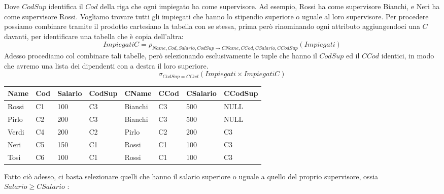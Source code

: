 \documentclass[12pt, letterpaper]{article}
\begin{document}
Dove \(CodSup\) identifica il \(Cod\) della riga che ogni impiegato ha come supervisore. Ad esempio, Rossi ha 
come supervisore Bianchi, e Neri ha come supervisore Rossi. Vogliamo trovare tutti gli impiegati che hanno 
lo stipendio superiore o uguale al loro supervisore. Per procedere possiamo combinare tramite il prodotto cartesiano 
la tabella con se stessa, prima però rinominando ogni attributo aggiungendoci una \(C\) davanti, per identificare 
una tabella che è copia dell'altra:
\begin{equation}
    ImpiegatiC = \rho_{Name,Cod,Salario,CodSup\rightarrow CName,CCod,CSalario,CCodSup }(Impiegati)
\end{equation}
Adesso procediamo col combinare tali tabelle, però selezionando esclusivamente le tuple che hanno 
il \(CodSup\) ed il \(CCod\) identici, in modo che avremo una lista dei dipendenti con a destra 
il loro superiore.
\begin{equation}
    \sigma_{CodSup=CCod}(Impiegati \times ImpiegatiC)
\end{equation}
\begin{center}
    \begin{tabular}{|l|l|l|l|l|l|l|l|}
        \hline
        Name  & Cod & Salario & CodSup & CName   & CCod & CSalario & CCodSup \\ \hline
        Rossi & C1  & 100     & C3     & Bianchi & C3   & 500      & NULL    \\ \hline
        Pirlo & C2  & 200     & C3     & Bianchi & C3   & 500      & NULL    \\ \hline
        Verdi & C4  & 200     & C2     & Pirlo   & C2   & 200      & C3      \\ \hline
        Neri  & C5  & 150     & C1     & Rossi   & C1   & 100      & C3      \\ \hline
        Tosi  & C6  & 100     & C1     & Rossi   & C1   & 100      & C3      \\ \hline
        \end{tabular}
\end{center}
Fatto ciò adesso, ci basta selezionare quelli che hanno il salario superiore o uguale a quello del proprio 
supervisore, ossia \(Salario\ge CSalario\) :
\end{document}
